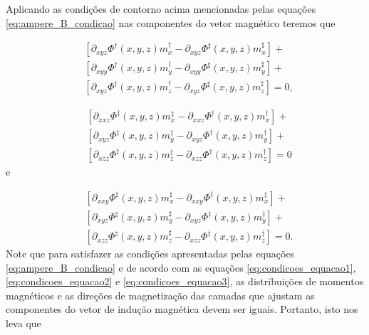 Aplicando as condições de contorno acima mencionadas pelas equações \ref{eq:ampere_B_condicao} nas componentes do vetor magnético teremos que

\begin{equation}
\begin{split}
&[\partial_{xyz} \Phi^{\dagger}(x, y, z) m_{x}^{\dagger} - \partial_{xyz} \Phi^{\sharp}(x, y, z) m_{x}^{\sharp}] + \:
\\ 
&[\partial_{xyy} \Phi^{\dagger}(x, y, z) m_{y}^{\dagger} - \partial_{xyy} \Phi^{\sharp}(x, y, z) m_{y}^{\sharp}] + \:
\\ 
&[\partial_{xyz} \Phi^{\dagger}(x, y, z) m_{z}^{\dagger} - \partial_{xyz} \Phi^{\sharp}(x, y, z) m_{z}^{\sharp}] = 0,
\end{split}
\label{eq:condicoes_equacao1}
\end{equation}

\begin{equation}
\begin{split}
&[\partial_{xxz} \Phi^{\ddagger}(x, y, z) m_{x}^{\ddagger} - \partial_{xxz} \Phi^{\dagger}(x, y, z) m_{x}^{\dagger}] + 
\\ 
&[\partial_{xyz} \Phi^{\ddagger}(x, y, z) m_{y}^{\ddagger} - \partial_{xyz} \Phi^{\dagger}(x, y, z) m_{y}^{\dagger}] + 
\\ 
&[\partial_{xzz} \Phi^{\ddagger}(x, y, z) m_{z}^{\ddagger} - \partial_{xzz} \Phi^{\dagger}(x, y, z) m_{z}^{\dagger}]= 0 
\end{split}
\label{eq:condicoes_equacao2}
\end{equation}
e

\begin{equation}
\begin{split}
&[\partial_{xxy} \Phi^{\sharp}(x, y, z) m_{x}^{\sharp} - \partial_{xxy} \Phi^{\ddagger}(x, y, z) m_{x}^{\ddagger}] + 
\\ 
&[\partial_{xyz} \Phi^{\sharp}(x, y, z) m_{y}^{\sharp} - \partial_{xyz} \Phi^{\ddagger}(x, y, z) m_{y}^{\ddagger}] + 
\\
&[\partial_{xzz} \Phi^{\sharp}(x, y, z) m_{z}^{\sharp} - \partial_{xzz} \Phi^{\ddagger}(x, y, z) m_{z}^{\ddagger}]  = 0.
\end{split}
\label{eq:condicoes_equacao3}
\end{equation}
Note que para satisfazer as condições apresentadas pelas equações \ref{eq:ampere_B_condicao} e de acordo com as equações \ref{eq:condicoes_equacao1}, \ref{eq:condicoes_equacao2} e \ref{eq:condicoes_equacao3}, as distribuições de momentos magnéticos e as direções de magnetização das camadas que ajustam as componentes do vetor de indução magnética devem ser iguais. Portanto, isto nos leva que 

